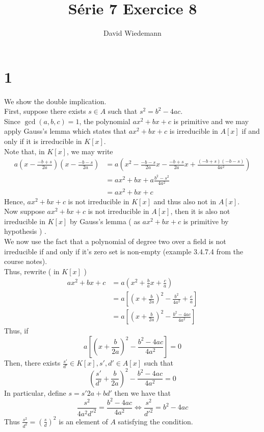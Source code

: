 \documentclass[11pt, a4paper]{article}
\begin{document}
\title{Série 7 Exercice 8}
\author{David Wiedemann}
\maketitle
\section*{1}
We show the double implication.\\
First, suppose there exists $s\in A$ such that $ s^{2}= b^{2}- 4ac$.\\
Since $\gcd( a,b,c) =1$, the polynomial $ax^{2}+bx + c$ is primitive and we may apply Gauss's lemma which states that $ax^{2}+bx+c$ is irreducible in $A[x]$  if and only if it is irreducible in $ K[x]$.\\
Note that, in $K[x]$, we may write
\begin{align*}
	a ( x- \frac{-b+s}{2a}) ( x- \frac{-b-s}{2a}) &=a\left(  x^{2} - \frac{-b-s}{2a}x - \frac{-b+s}{2a} x + \frac{( -b+s) ( -b-s) }{4a^{2}} \right)\\
&= ax^{2} + bx + a \frac{b^{2}-s^{2}}{4a^{2}} \\
&= ax^{2} + bx + c
\end{align*}
Hence, $ax^{2}+bx+c$ is not irreducible in $K[x]$ and thus also not in $A[x]$.\\

Now suppose $ ax^{2}+bx + c$ is not irreducible in $A[x] $, then it is also not irreducible in $ K[x]$ by Gauss's lemma ( as $ ax^{2}+ bx +c$ is primitive by hypothesis ) .\\
We now use the fact that a polynomial of degree two over a field is not irreducible if and only if it's zero set is non-empty (example 3.4.7.4 from the course notes).\\
Thus, rewrite ( in $K[x]$ ) 
\begin{align*}
ax^{2} + bx + c &= a ( x^{2}+ \frac{b}{a}x + \frac{c}{a}) \\
&= a \left[ ( x+ \frac{b}{2a})^{2}  - \frac{b^{2}}{4a^{2}}+ \frac{c}{a} \right] \\
&= a \left[ ( x+ \frac{b}{2a}) ^{2} - \frac{b^{2}- 4ac}{4a^{2}} \right] 
\end{align*}
Thus, if 
\[ 
a \left[ ( x+ \frac{b}{2a}) ^{2} - \frac{b^{2}-4ac}{4a^{2}} \right] =0
\]
Then, there exists $ \frac{s'}{d'}\in K[x], s',d' \in A[x]$ such that
\[ 
 ( \frac{s'}{d'} + \frac{b}{2a}) ^{2} - \frac{b^{2}-4ac}{4a^{2}} = 0
\]
In particular, define $ s=  s'2a + bd' $ then we have that 
\[ 
\frac{s^{2}}{4a^{2}d'^{2}}= \frac{b^{2}-4ac}{4a^{2}}\iff \frac{s^{2}}{d'^{2}} = b^{2}-4ac
\]
Thus $ \frac{s^{2}}{d^{2}}= \left( \frac{s}{d}\right) ^{2}$ is an element of $A$  satisfying the condition.
\end{document}
